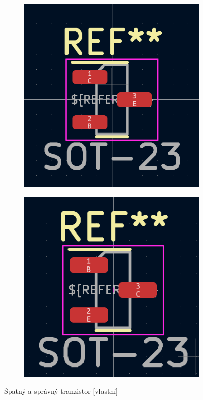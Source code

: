 \documentclass[12pt,a4paper]{article}
\begin{document}
\begin{figure}[H]
	\centering
	\begin{subfigure}[b]{0.49\textwidth}
	  \includegraphics[width=\textwidth]{pictures/wrong_npn.png}
	  \vspace{\fill}
	\end{subfigure}
	\centering
	\hfill
	\begin{subfigure}[b]{0.49\textwidth}
	  \includegraphics[width=\textwidth]{pictures/right_npn.png}
	  \vspace{\fill}
	\end{subfigure}
	\caption{Špatný a správný tranzistor [vlastní]}
  \end{figure}
\end{document}
